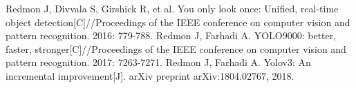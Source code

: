 \documentclass[a4paper, notitlepage]{article}
\begin{document}
\begin{thebibliography}{X}
Redmon J, Divvala S, Girshick R, et al. You only look once: Unified, real-time object detection[C]//Proceedings of the IEEE conference on computer vision and pattern recognition. 2016: 779-788.
Redmon J, Farhadi A. YOLO9000: better, faster, stronger[C]//Proceedings of the IEEE conference on computer vision and pattern recognition. 2017: 7263-7271. 
Redmon J, Farhadi A. Yolov3: An incremental improvement[J]. arXiv preprint arXiv:1804.02767, 2018.
\end{thebibliography}

\clearpage


\end{document}
